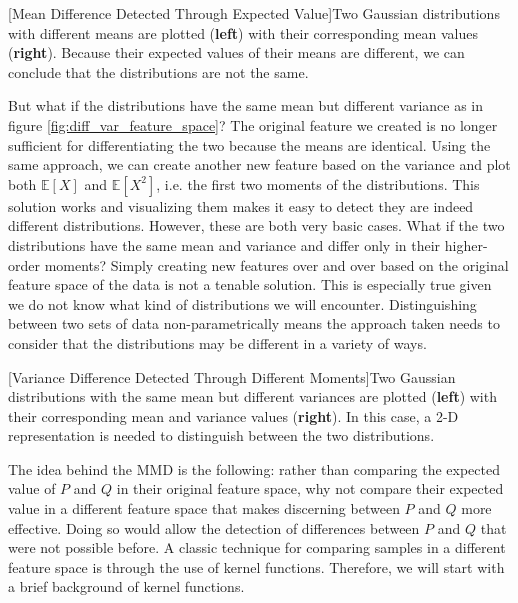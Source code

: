 \begin{center}
[Mean Difference Detected Through Expected Value]{Two Gaussian distributions with different means are plotted (\textbf{left}) with their corresponding mean values (\textbf{right}). Because their expected values of their means are different, we can conclude that the distributions are not the same.} 
\resizebox{\textwidth}{!}{\hbox{}}
\label{fig:diff_mean_feature_space}
\end{center}

But what if the distributions have the same mean but different variance as in figure \ref{fig:diff_var_feature_space}? The original feature we created is no longer sufficient for differentiating the two because the means are identical. Using the same approach, we can create another new feature based on the variance and plot both $\mathbb{E}[X]$ and $\mathbb{E}[X^2]$, i.e. the first two moments of the distributions. This solution works and visualizing them makes it easy to detect they are indeed different distributions. However, these are both very basic cases. What if the two distributions have the same mean and variance and differ only in their higher-order moments? Simply creating new features over and over based on the original feature space of the data is not a tenable solution. This is especially true given we do not know what kind of distributions we will encounter. Distinguishing between two sets of data non-parametrically means the approach taken needs to consider that the distributions may be different in a variety of ways. 

\begin{minipage}{0.95\textwidth}
\begin{center}
[Variance Difference Detected Through Different Moments]{Two Gaussian distributions with the same mean but different variances are plotted (\textbf{left}) with their corresponding mean and variance values (\textbf{right}). In this case, a 2-D representation is needed to distinguish between the two distributions.} 
\resizebox{\textwidth}{!}{\hbox{}}
\label{fig:diff_var_feature_space}
\end{center}
\end{minipage}

The idea behind the MMD is the following: rather than comparing the expected value of $P$ and $Q$ in their original feature space, why not compare their expected value in a different feature space that makes discerning between $P$ and $Q$ more effective. Doing so would allow the detection of differences between $P$ and $Q$ that were not possible before. A classic technique for comparing samples in a different feature space is through the use of kernel functions. Therefore, we will start with a brief background of kernel functions.

